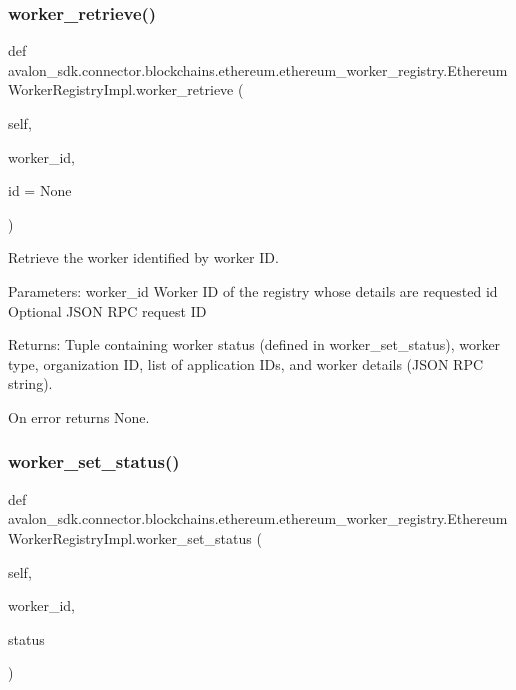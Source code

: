 \subsubsection{\texorpdfstring{worker\+\_\+retrieve()}{worker\_retrieve()}}
{\footnotesize\ttfamily def avalon\+\_\+sdk.\+connector.\+blockchains.\+ethereum.\+ethereum\+\_\+worker\+\_\+registry.\+Ethereum\+Worker\+Registry\+Impl.\+worker\+\_\+retrieve (\begin{DoxyParamCaption}\item[{}]{self,  }\item[{}]{worker\+\_\+id,  }\item[{}]{id = {\ttfamily None} }\end{DoxyParamCaption})}

\begin{DoxyVerb}Retrieve the worker identified by worker ID.

Parameters:
worker_id  Worker ID of the registry whose details are requested
id         Optional JSON RPC request ID

Returns:
Tuple containing worker status (defined in worker_set_status),
worker type, organization ID, list of application IDs, and worker
details (JSON RPC string).

On error returns None.
\end{DoxyVerb}
 \mbox{\label{classavalon__sdk_1_1connector_1_1blockchains_1_1ethereum_1_1ethereum__worker__registry_1_1EthereumWorkerRegistryImpl_a66cd281d07d4dc1f16fb36e31321acb8}} 
\subsubsection{\texorpdfstring{worker\+\_\+set\+\_\+status()}{worker\_set\_status()}}
{\footnotesize\ttfamily def avalon\+\_\+sdk.\+connector.\+blockchains.\+ethereum.\+ethereum\+\_\+worker\+\_\+registry.\+Ethereum\+Worker\+Registry\+Impl.\+worker\+\_\+set\+\_\+status (\begin{DoxyParamCaption}\item[{}]{self,  }\item[{}]{worker\+\_\+id,  }\item[{}]{status }\end{DoxyParamCaption})}

